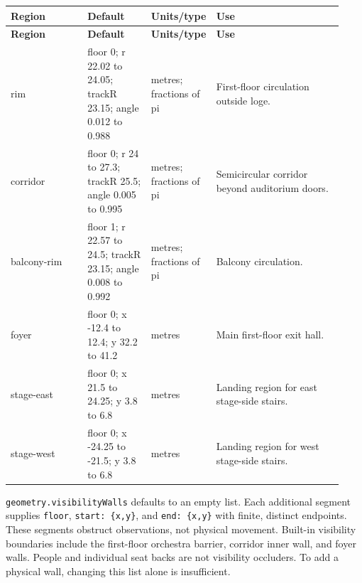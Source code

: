 \documentclass[11pt]{article}
\begin{document}
{\small\setlength{\tabcolsep}{4pt}

\begin{longtable}{@{}p{0.23\linewidth}p{0.19\linewidth}p{0.13\linewidth}p{0.38\linewidth}@{}}

\toprule

\textbf{Region} & \textbf{Default} & \textbf{Units/type} & \textbf{Use} \\

\midrule\endfirsthead

\toprule

\textbf{Region} & \textbf{Default} & \textbf{Units/type} & \textbf{Use} \\

\midrule\endhead

\bottomrule\endfoot

rim & floor 0; r 22.02 to 24.05; trackR 23.15; angle 0.012 to 0.988 & metres; fractions of pi & First-floor circulation outside loge. \\

corridor & floor 0; r 24 to 27.3; trackR 25.5; angle 0.005 to 0.995 & metres; fractions of pi & Semicircular corridor beyond auditorium doors. \\

balcony-rim & floor 1; r 22.57 to 24.5; trackR 23.15; angle 0.008 to 0.992 & metres; fractions of pi & Balcony circulation. \\

foyer & floor 0; x -12.4 to 12.4; y 32.2 to 41.2 & metres & Main first-floor exit hall. \\

stage-east & floor 0; x 21.5 to 24.25; y 3.8 to 6.8 & metres & Landing region for east stage-side stairs. \\

stage-west & floor 0; x -24.25 to -21.5; y 3.8 to 6.8 & metres & Landing region for west stage-side stairs. \\

\end{longtable}

}

\texttt{geometry.\allowbreak{}visibility\allowbreak{}Walls} defaults to an empty list. Each additional segment supplies \texttt{floor}, \texttt{start:\allowbreak{} \{x,\allowbreak{}y\}}, and \texttt{end:\allowbreak{} \{x,\allowbreak{}y\}} with finite, distinct endpoints. These segments obstruct observations, not physical movement. Built-in visibility boundaries include the first-floor orchestra barrier, corridor inner wall, and foyer walls. People and individual seat backs are not visibility occluders. To add a physical wall, changing this list alone is insufficient.
\end{document}
